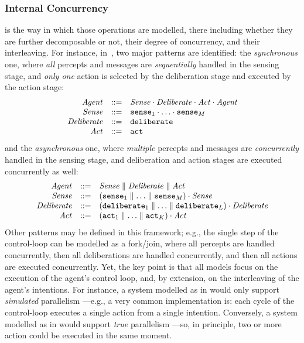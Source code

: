 \subsubsection{Internal Concurrency} is the way in which those operations are modelled,
there including whether they are further decomposable or not, their degree of concurrency, and their interleaving.
%
For instance, in~\cite{ZatelliRH2015}, two major patterns are identified:
the \emph{synchronous} one,  where \emph{all} percepts and messages are \emph{sequentially} handled in the sensing stage,
and \emph{only one} action is selected by the deliberation stage and executed by the action stage:
%
\begin{equation}\label{eq:sequentialIC}
  \begin{array}{rcl}
    \V{agent} & \defeq & \V{sense} \cdot \V{deliberate} \cdot \V{Act} \cdot \V{agent} \\
    \V{sense} & \defeq & \T{sense}_1 \cdot \ldots \cdot \T{sense}_M \\
    \V{deliberate} & \defeq & \T{deliberate} \\
    \V{act} & \defeq & \T{act} \\
  \end{array}
\end{equation}
%
and the \emph{asynchronous} one, where \emph{multiple} percepts and messages are \emph{concurrently} handled in the sensing stage,
and deliberation and action stages are executed concurrently as well:
%
\begin{equation}\label{eq:parallelIC}
  \begin{array}{rcl}
    \V{agent} & \defeq & \V{sense} \parallel \V{deliberate} \parallel \V{act} \\
    \V{sense} & \defeq & (\T{sense}_1 \parallel \ldots \parallel \T{sense}_M) \cdot \V{sense} \\
    \V{deliberate} & \defeq & (\T{deliberate}_1 \parallel \ldots \parallel \T{deliberate}_L) \cdot \V{deliberate} \\
    \V{act} & \defeq & (\T{act}_1 \parallel \ldots \parallel \T{act}_K) \cdot \V{act} \\
  \end{array}
\end{equation}
%
Other patterns may be defined in this framework;
e.g., the single step of the control-loop can be modelled as a fork/join,
where all percepts are handled concurrently,
then all deliberations are handled concurrently, and then all actions are executed concurrently.
%
Yet, the key point is that all models focus on the execution of the agent's control loop,
and, by extension, on the interleaving of the agent's intentions.
%
For instance, 
a system modelled as in  would only support \emph{simulated} parallelism%
---e.g., a very common implementation is: 
each cycle of the control-loop executes a single action from a single intention.
%
Conversely, a system modelled as in  would support \emph{true} parallelism%
---so, in principle, two or more action could be executed in the same moment.


